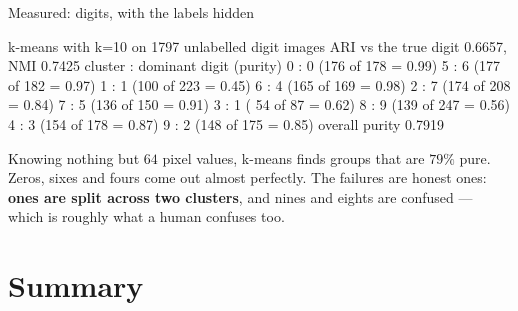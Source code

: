 \documentclass[aspectratio=169]{beamer}
\begin{document}
\begin{frame}[fragile,shrink=9]{Measured: digits, with the labels hidden}
\begin{outblk}
k-means with k=10 on 1797 unlabelled digit images
   ARI vs the true digit 0.6657, NMI 0.7425
   cluster : dominant digit (purity)
      0 : 0 (176 of 178 = 0.99)      5 : 6 (177 of 182 = 0.97)
      1 : 1 (100 of 223 = 0.45)      6 : 4 (165 of 169 = 0.98)
      2 : 7 (174 of 208 = 0.84)      7 : 5 (136 of 150 = 0.91)
      3 : 1 ( 54 of  87 = 0.62)      8 : 9 (139 of 247 = 0.56)
      4 : 3 (154 of 178 = 0.87)      9 : 2 (148 of 175 = 0.85)
   overall purity 0.7919
\end{outblk}
  \begin{center}\small
    Knowing nothing but $64$ pixel values, k-means finds groups that are
    $79\%$ pure. Zeros, sixes and fours come out almost perfectly. The
    failures are honest ones: \textbf{ones are split across two clusters},
    and nines and eights are confused --- which is roughly what a human
    confuses too.
  \end{center}
\end{frame}

\section{Summary}
\label{sec:summary}
\end{document}
